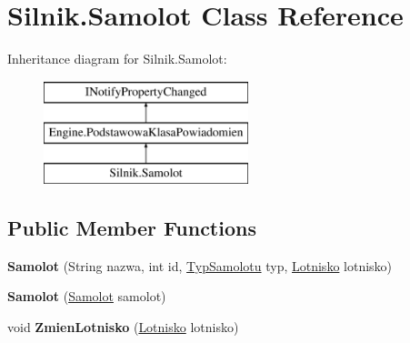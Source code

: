 \hypertarget{class_silnik_1_1_samolot}{}\section{Silnik.\+Samolot Class Reference}
\label{class_silnik_1_1_samolot}
Inheritance diagram for Silnik.\+Samolot\+:\begin{figure}[H]
\begin{center}
\leavevmode
\includegraphics[height=3.000000cm]{class_silnik_1_1_samolot}
\end{center}
\end{figure}
\subsection*{Public Member Functions}
\begin{DoxyCompactItemize}
\item 
\mbox{\label{class_silnik_1_1_samolot_aa11a612339f1e4d1ca48c0f0da3f3497}} 
{\bfseries Samolot} (String nazwa, int id, \mbox{\hyperlink{class_silnik_1_1_models_1_1_typ_samolotu}{Typ\+Samolotu}} typ, \mbox{\hyperlink{class_silnik_1_1_lotnisko}{Lotnisko}} lotnisko)
\item 
\mbox{\label{class_silnik_1_1_samolot_a1eabd12a9871932843e841eb51dd3383}} 
{\bfseries Samolot} (\mbox{\hyperlink{class_silnik_1_1_samolot}{Samolot}} samolot)
\item 
\mbox{\label{class_silnik_1_1_samolot_a2d01b94103ebc6a2741a435341673bf1}} 
void {\bfseries Zmien\+Lotnisko} (\mbox{\hyperlink{class_silnik_1_1_lotnisko}{Lotnisko}} lotnisko)
\end{DoxyCompactItemize}
